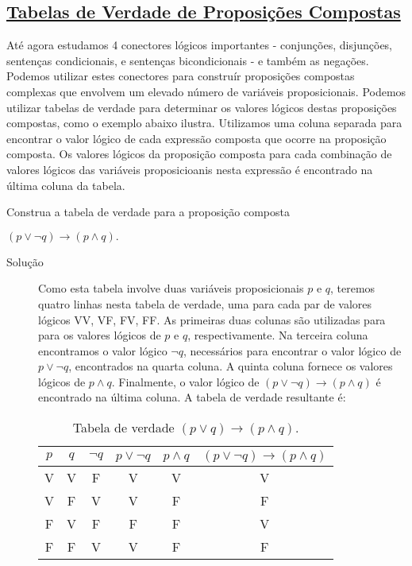 \subsection*{\underline{Tabelas de Verdade de Proposições Compostas}}

Até agora estudamos 4 conectores lógicos importantes - conjunções, disjunções,
sentenças condicionais, e sentenças bicondicionais - e também as negações.
Podemos utilizar estes conectores para construír proposições compostas complexas
que envolvem um elevado número de variáveis proposicionais. Podemos utilizar
tabelas de verdade para determinar os valores lógicos destas proposições
compostas, como o exemplo abaixo ilustra. Utilizamos uma coluna separada para
encontrar o valor lógico de cada expressão composta que ocorre na proposição
composta. Os valores lógicos da proposição composta para cada combinação de
valores lógicos das variáveis proposicioanis nesta expressão é encontrado na
última coluna da tabela.

\label{exem19}
\begin{exmp}
Construa a tabela de verdade para a proposição composta \begin{center}$(p \lor
\lnot q) \to (p \land q).$\end{center}
\end{exmp}

\begin{description}
\item[Solução] Como esta tabela involve duas variáveis proposicionais $p$ e $q$,
teremos quatro linhas nesta tabela de verdade, uma para cada par de valores
lógicos VV, VF, FV, FF. As primeiras duas colunas são utilizadas para para os
valores lógicos de $p$ e $q$, respectivamente. Na terceira coluna encontramos o
valor lógico $\lnot q$, necessários para encontrar o valor lógico de $p \lor
\lnot q$, encontrados na quarta coluna. A quinta coluna fornece os valores
lógicos de $p \land q$. Finalmente, o valor lógico de $(p \lor \lnot q) \to (p
\land q)$ é encontrado na última coluna. A tabela de verdade resultante é:\\

\begin{table}[H]
	\centering
	\begin{tabular}{|c|c|c|c|c|c|}%
	\toprule
	\textbf{$p$} & \textbf{$q$}	& \textbf{$\lnot q$} & \textbf{$p \lor \lnot q$} &
	\textbf{$p \land q$} & \textbf{$(p \lor \lnot q) \to (p \land q)$}\\
	\midrule
	V &	V & F & V & V & V\\
	V &	F & V & V & F & F\\
	F &	V & F & F & F & V\\
	F &	F & V & V & F & F\\
	\bottomrule%
	\end{tabular}%
	\caption{Tabela de verdade $(p \lor q) \to
(p \land q)$.}
	\label{tabela:17}
\end{table}
\end{description}

